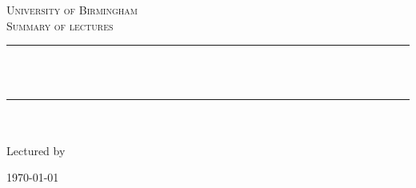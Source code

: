 \newcommand{\HRule}{\rule{\linewidth}{0.5mm}}

\begin{titlepage}
\begin{center}


\textsc{\LARGE University of Birmingham}\\[1.5cm]

\textsc{\Large Summary of lectures}\\[0.5cm]


\HRule \\[0.4cm]
{ \huge \bfseries \nameOfTheModule}\\[0.4cm]
\HRule \\[1.5cm]

\nameOfTheAuthor \\
Lectured by \\
\nameOfTheLecturer

\vfill

{\large \today}

\end{center}
\end{titlepage}